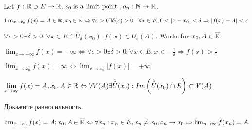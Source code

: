 Let $f: \mathbb{R} \supset E \to \mathbb{R}, x_0 \text{ is a limit point }, a_n: \mathbb{N} \to \mathbb{R} $.

\begin{definition}[Cauchy]
	$\lim_{x \to x_0} f(x) = A \in \mathbb{R}, x_0 \in \mathbb{R} \Leftrightarrow \forall \varepsilon > 0 \exists \delta(\varepsilon) > 0: \forall x \in E, 0 < \left| x - x_0 \right| < \delta \Rightarrow \left| f(x) - A \right| < \varepsilon$
\end{definition}

\begin{definition}
	$\forall \epsilon > 0 \exists \delta > 0: \forall x \in E \cap \overset{\circ} U_\delta (x_0): f(x) \in U_\epsilon (A) $. Works for $x_0, A \in \overline{\mathbb{R}}$
\end{definition}

\begin{example}[]
	$\lim_{x \to -\infty} f(x) = +\infty \Leftrightarrow \forall \epsilon > 0 \exists \delta > 0: \forall x \in E, x < -\frac{1}{\delta} \Rightarrow f(x) > \frac{1}{\epsilon}$
\end{example}

\begin{note}[]
	$\lim_{x \to x_0} f(x) = \infty \Leftrightarrow \lim_{x \to x_0} \left| f(x) \right| = +\infty$
\end{note}

\begin{definition}[topological]
	$\displaystyle \lim_{x \to x_0} f(x) = A, x_0, A \in \mathbb{R} \Leftrightarrow \forall V(A) \exists \overset{\circ} U (x_0): Im \left( \overset{\circ} U (x_0) \cap E \right) \subset V(A)$
\end{definition}

\begin{exercise}
	Докажите равносильность.
\end{exercise}

\begin{definition}[ГЕЙне]
	$\lim_{x \to x_0} f(x) = A; x_0, A \in \overline{\mathbb{R}} \Leftrightarrow \forall x_n: x_n \in E, x_n \neq x_0, x_n \to x_0 \Rightarrow \lim_{n \to \infty} f(x_n) = A$
\end{definition}

